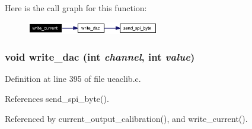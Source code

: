 Here is the call graph for this function:\begin{figure}[H]
\begin{center}
\leavevmode
\includegraphics[width=163pt]{ueaclib_8c_a20_cgraph}
\end{center}
\end{figure}
\subsubsection{\setlength{\rightskip}{0pt plus 5cm}void write\_\-dac (int {\em channel}, int {\em value})}\label{ueaclib_8c_a21}




Definition at line 395 of file ueaclib.c.

References send\_\-spi\_\-byte().

Referenced by current\_\-output\_\-calibration(), and write\_\-current().

